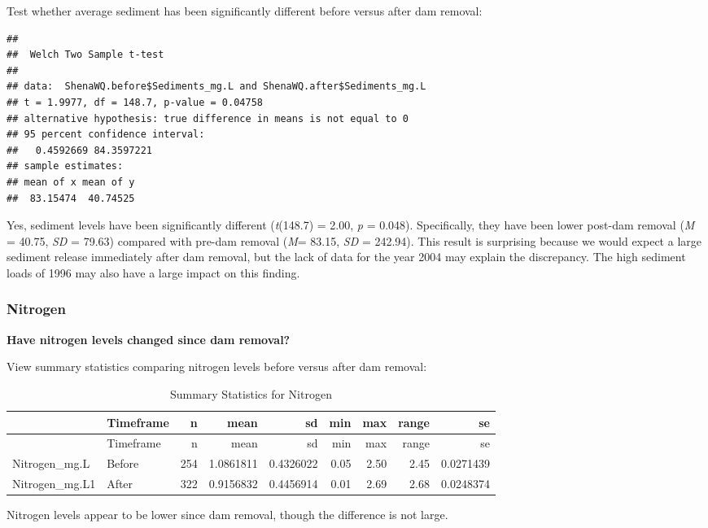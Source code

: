 \documentclass[
  12pt,
]{article}
\begin{document}
Test whether average sediment has been significantly different before
versus after dam removal:

\begin{verbatim}
## 
##  Welch Two Sample t-test
## 
## data:  ShenaWQ.before$Sediments_mg.L and ShenaWQ.after$Sediments_mg.L
## t = 1.9977, df = 148.7, p-value = 0.04758
## alternative hypothesis: true difference in means is not equal to 0
## 95 percent confidence interval:
##   0.4592669 84.3597221
## sample estimates:
## mean of x mean of y 
##  83.15474  40.74525
\end{verbatim}

Yes, sediment levels have been significantly different (\emph{t}(148.7)
= 2.00, \emph{p} = 0.048). Specifically, they have been lower post-dam
removal (\emph{M} = 40.75, \emph{SD} = 79.63) compared with pre-dam
removal (\emph{M}= 83.15, \emph{SD} = 242.94). This result is surprising
because we would expect a large sediment release immediately after dam
removal, but the lack of data for the year 2004 may explain the
discrepancy. The high sediment loads of 1996 may also have a large
impact on this finding.

\newpage

\hypertarget{nitrogen}{%
\subsubsection{Nitrogen}\label{nitrogen}}

\textbf{Have nitrogen levels changed since dam removal?}

View summary statistics comparing nitrogen levels before versus after
dam removal:

\begin{longtable}[]{@{}llrrrrrrr@{}}
\caption{Summary Statistics for Nitrogen}\tabularnewline
\toprule
& Timeframe & n & mean & sd & min & max & range & se \\
\midrule
\endfirsthead
\toprule
& Timeframe & n & mean & sd & min & max & range & se \\
\midrule
\endhead
Nitrogen\_mg.L & Before & 254 & 1.0861811 & 0.4326022 & 0.05 & 2.50 &
2.45 & 0.0271439 \\
Nitrogen\_mg.L1 & After & 322 & 0.9156832 & 0.4456914 & 0.01 & 2.69 &
2.68 & 0.0248374 \\
\bottomrule
\end{longtable}

Nitrogen levels appear to be lower since dam removal, though the
difference is not large.
\end{document}
